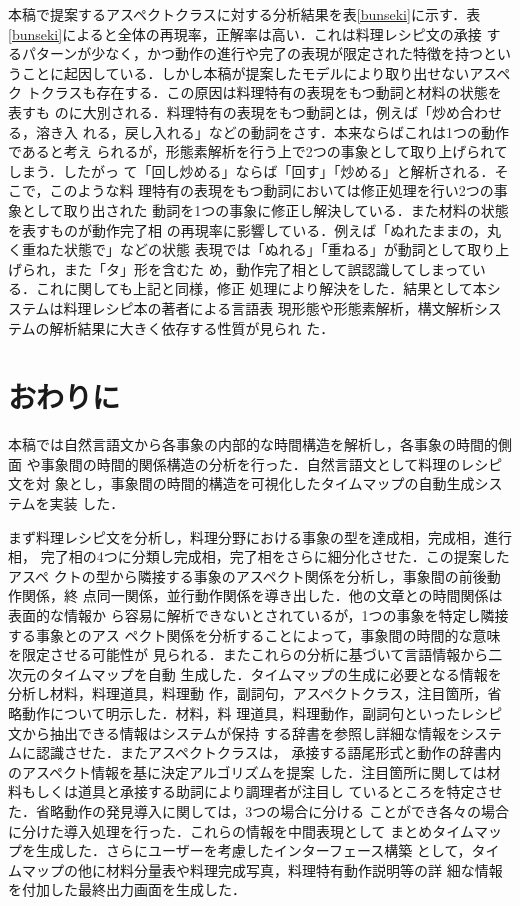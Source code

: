本稿で提案するアスペクトクラスに対する分析結果を表\ref{bunseki}に示す．表
\ref{bunseki}によると全体の再現率，正解率は高い．これは料理レシピ文の承接
するパターンが少なく，かつ動作の進行や完了の表現が限定された特徴を持つとい
うことに起因している．しかし本稿が提案したモデルにより取り出せないアスペク
トクラスも存在する．この原因は料理特有の表現をもつ動詞と材料の状態を表すも
のに大別される．料理特有の表現をもつ動詞とは，例えば「炒め合わせる，溶き入
れる，戻し入れる」などの動詞をさす．本来ならばこれは1つの動作であると考え
られるが，形態素解析を行う上で2つの事象として取り上げられてしまう．したがっ
て「回し炒める」ならば「回す」「炒める」と解析される．そこで，このような料
理特有の表現をもつ動詞においては修正処理を行い2つの事象として取り出された
動詞を1つの事象に修正し解決している．また材料の状態を表すものが動作完了相
の再現率に影響している．例えば「ぬれたままの，丸く重ねた状態で」などの状態
表現では「ぬれる」「重ねる」が動詞として取り上げられ，また「タ」形を含むた
め，動作完了相として誤認識してしまっている．これに関しても上記と同様，修正
処理により解決をした．結果として本システムは料理レシピ本の著者による言語表
現形態や形態素解析，構文解析システムの解析結果に大きく依存する性質が見られ
た．


\section{おわりに}
      
本稿では自然言語文から各事象の内部的な時間構造を解析し，各事象の時間的側面
や事象間の時間的関係構造の分析を行った．自然言語文として料理のレシピ文を対
象とし，事象間の時間的構造を可視化したタイムマップの自動生成システムを実装
した．

まず料理レシピ文を分析し，料理分野における事象の型を達成相，完成相，進行相，
完了相の4つに分類し完成相，完了相をさらに細分化させた．この提案したアスペ
クトの型から隣接する事象のアスペクト関係を分析し，事象間の前後動作関係，終
点同一関係，並行動作関係を導き出した．他の文章との時間関係は表面的な情報か
ら容易に解析できないとされているが，1つの事象を特定し隣接する事象とのアス
ペクト関係を分析することによって，事象間の時間的な意味を限定させる可能性が
見られる．またこれらの分析に基づいて言語情報から二次元のタイムマップを自動
生成した．タイムマップの生成に必要となる情報を分析し材料，料理道具，料理動
作，副詞句，アスペクトクラス，注目箇所，省略動作について明示した．材料，料
理道具，料理動作，副詞句といったレシピ文から抽出できる情報はシステムが保持
する辞書を参照し詳細な情報をシステムに認識させた．またアスペクトクラスは，
承接する語尾形式と動作の辞書内のアスペクト情報を基に決定アルゴリズムを提案
した．注目箇所に関しては材料もしくは道具と承接する助詞により調理者が注目し
ているところを特定させた．省略動作の発見導入に関しては，3つの場合に分ける
ことができ各々の場合に分けた導入処理を行った．これらの情報を中間表現として
まとめタイムマップを生成した．さらにユーザーを考慮したインターフェース構築
として，タイムマップの他に材料分量表や料理完成写真，料理特有動作説明等の詳
細な情報を付加した最終出力画面を生成した．



